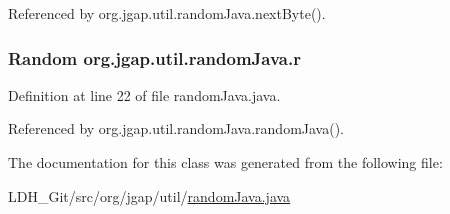 Referenced by org.\-jgap.\-util.\-random\-Java.\-next\-Byte().

\hypertarget{classorg_1_1jgap_1_1util_1_1random_java_ac537c7a41f5dcc3bc155e348c9e6086d}{
\subsubsection[{r}]{\setlength{\rightskip}{0pt plus 5cm}Random org.\-jgap.\-util.\-random\-Java.\-r\hspace{0.3cm}{\ttfamily [private]}}}\label{classorg_1_1jgap_1_1util_1_1random_java_ac537c7a41f5dcc3bc155e348c9e6086d}


Definition at line 22 of file random\-Java.\-java.



Referenced by org.\-jgap.\-util.\-random\-Java.\-random\-Java().



The documentation for this class was generated from the following file\-:\begin{DoxyCompactItemize}
\item 
L\-D\-H\-\_\-\-Git/src/org/jgap/util/\hyperlink{random_java_8java}{random\-Java.\-java}\end{DoxyCompactItemize}
